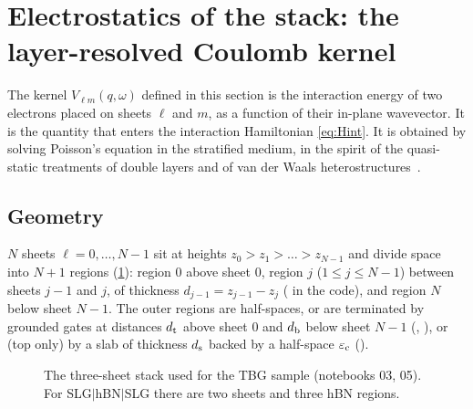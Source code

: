 \section{Electrostatics of the stack: the layer-resolved Coulomb kernel}
\label{sec:electrostatics}

The kernel $V_{\ell m}(q,\omega)$ defined in this section is the interaction energy of two electrons placed on sheets $\ell$
and $m$, as a function of their in-plane wavevector. It is the quantity that enters the interaction Hamiltonian
\eqref{eq:Hint}. It is obtained by solving Poisson's equation in the stratified medium, in the spirit of the
quasi-static treatments of double layers and of van der Waals heterostructures~\cite{Profumo2012,Andersen2015}.

\subsection{Geometry}

$N$ sheets $\ell=0,\dots,N-1$ sit at heights $z_0>z_1>\dots>z_{N-1}$ and divide space into $N+1$ regions
(\cref{fig:stack}): region $0$ above sheet $0$, region $j$ ($1\le j\le N-1$) between sheets $j-1$ and $j$,
of thickness $d_{j-1}=z_{j-1}-z_j$ ( in the code), and region $N$ below sheet $N-1$. The outer
regions are half-spaces, or are terminated by grounded gates at distances $d_{\rm t}$ above sheet $0$ and
$d_{\rm b}$ below sheet $N-1$ (, ), or (top only) by a slab of
thickness $d_{\rm s}$ backed by a half-space $\varepsilon_{\rm c}$ ().

\begin{figure}[h]
\centering
{}
\caption{The three-sheet stack used for the TBG sample (notebooks 03, 05). For SLG$|$hBN$|$SLG there are two
sheets and three hBN regions.}
\label{fig:stack}
\end{figure}

